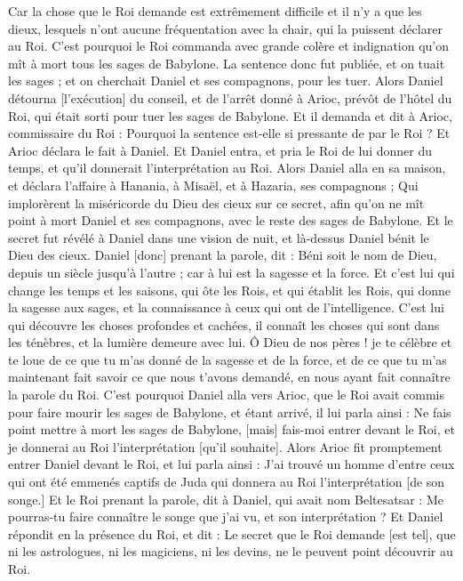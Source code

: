 \begin{multicols}{2}
Car la chose que le Roi demande est extrêmement difficile et il n'y a que les dieux, lesquels n'ont aucune fréquentation avec la chair, qui la puissent déclarer au Roi.
C'est pourquoi le Roi commanda avec grande colère et indignation qu'on mît à mort tous les sages de Babylone.
La sentence donc fut publiée, et on tuait les sages ; et on cherchait Daniel et ses compagnons, pour les tuer.
Alors Daniel détourna [l'exécution] du conseil, et de l'arrêt donné à Arioc, prévôt de l'hôtel du Roi, qui était sorti pour tuer les sages de Babylone.
Et il demanda et dit à Arioc, commissaire du Roi : Pourquoi la sentence est-elle si pressante de par le Roi ? Et Arioc déclara le fait à Daniel.
Et Daniel entra, et pria le Roi de lui donner du temps, et qu'il donnerait l'interprétation au Roi.
Alors Daniel alla en sa maison, et déclara l'affaire à Hanania, à Misaël, et à Hazaria, ses compagnons ;
Qui implorèrent la miséricorde du Dieu des cieux sur ce secret, afin qu'on ne mît point à mort Daniel et ses compagnons, avec le reste des sages de Babylone.
Et le secret fut révélé à Daniel dans une vision de nuit, et là-dessus Daniel bénit le Dieu des cieux.
Daniel [donc] prenant la parole, dit : Béni soit le nom de Dieu, depuis un siècle jusqu'à l'autre ; car à lui est la sagesse et la force.
Et c'est lui qui change les temps et les saisons, qui ôte les Rois, et qui établit les Rois, qui donne la sagesse aux sages, et la connaissance à ceux qui ont de l'intelligence.
C'est lui qui découvre les choses profondes et cachées, il connaît les choses qui sont dans les ténèbres, et la lumière demeure avec lui.
Ô Dieu de nos pères ! je te célèbre et te loue de ce que tu m'as donné de la sagesse et de la force, et de ce que tu m'as maintenant fait savoir ce que nous t'avons demandé, en nous ayant fait connaître la parole du Roi.
C'est pourquoi Daniel alla vers Arioc, que le Roi avait commis pour faire mourir les sages de Babylone, et étant arrivé, il lui parla ainsi : Ne fais point mettre à mort les sages de Babylone, [mais] fais-moi entrer devant le Roi, et je donnerai au Roi l'interprétation [qu'il souhaite].
Alors Arioc fit promptement entrer Daniel devant le Roi, et lui parla ainsi : J'ai trouvé un homme d'entre ceux qui ont été emmenés captifs de Juda qui donnera au Roi l'interprétation [de son songe.]
Et le Roi prenant la parole, dit à Daniel, qui avait nom Beltesatsar : Me pourras-tu faire connaître le songe que j'ai vu, et son interprétation ?
Et Daniel répondit en la présence du Roi, et dit : Le secret que le Roi demande [est tel], que ni les astrologues, ni les magiciens, ni les devins, ne le peuvent point découvrir au Roi.

\end{multicols}
